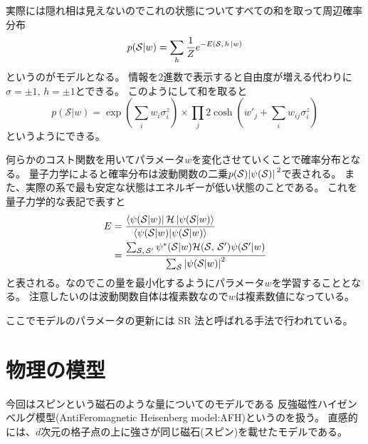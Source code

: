\documentclass[twocolumn,10pt,dvipdfmx,a4paper]{jsarticle}
\begin{document}
実際には隠れ相は見えないのでこれの状態についてすべての和を取って周辺確率分布
\begin{equation}
    p(\mathcal{S}|w)=\sum_h \frac{1}{Z}e^{-E\qty(\mathcal{S},\,h\, | w )}
\end{equation}
というのがモデルとなる。
情報を2進数で表示すると自由度が増える代わりに\(\sigma=\pm 1,\,h=\pm1\)とできる。
このようにして和を取ると
\begin{equation}
    p(\mathcal{S}|w)=\exp(\sum_i w_i\sigma_i^z)\times\prod_j 2\cosh({w'}_j+\sum_i w_{ij}\sigma_i^z)
\end{equation}
というようにできる。

何らかのコスト関数を用いてパラメータ\(w\)を変化させていくことで確率分布となる。
量子力学によると確率分布は波動関数の二乗\(p(\mathcal{S})\abs*{\psi(\mathcal{S})}^2\)で表される。
また、実際の系で最も安定な状態はエネルギーが低い状態のことである。
これを量子力学的な表記で表すと
\begin{align}
    E &= \frac{\bra{\psi(\mathcal{S}|w)}\mathcal{H}\ket{\psi(\mathcal{S}|w)}}{\braket{\psi(\mathcal{S}|w)}}\\
    &= \frac{\sum_{\mathcal{S},\, \mathcal{S}'}\psi^*(\mathcal{S}|w)\mathcal{H}(\mathcal{S},\,\mathcal{S}')\psi(\mathcal{S}'|w)}{\sum_\mathcal{S} \abs{\psi(\mathcal{S}|w)}^2}
\end{align}
と表される。なのでこの量を最小化するようにパラメータ\(w\)を学習することとなる。
注意したいのは波動関数自体は複素数なので\(w\)は複素数値になっている。

ここでモデルのパラメータの更新には SR 法と呼ばれる手法で行われている。

\section{物理の模型}
今回はスピンという磁石のような量についてのモデルである
反強磁性ハイゼンベルグ模型(AntiFeromagnetic Heisenberg model:AFH)というのを扱う。
直感的には、\(d\)次元の格子点の上に強さが同じ磁石(スピン)を載せたモデルである。
\end{document}
